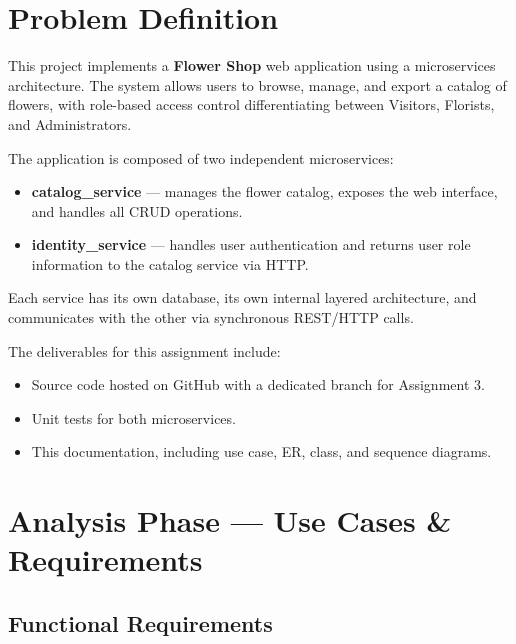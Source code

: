 \section{Problem Definition}

\par This project implements a \textbf{Flower Shop} web application using a microservices architecture.
The system allows users to browse, manage, and export a catalog of flowers, with role-based access control differentiating between Visitors, Florists, and Administrators.

\par The application is composed of two independent microservices:
\begin{itemize}
    \item \textbf{catalog\_service} — manages the flower catalog, exposes the web interface, and handles all CRUD operations.
    \item \textbf{identity\_service} — handles user authentication and returns user role information to the catalog service via HTTP.
\end{itemize}

\par Each service has its own database, its own internal layered architecture, and communicates with the other via synchronous REST/HTTP calls.

\par The deliverables for this assignment include:
\begin{itemize}
    \item Source code hosted on GitHub with a dedicated branch for Assignment 3.
    \item Unit tests for both microservices.
    \item This documentation, including use case, ER, class, and sequence diagrams.
\end{itemize}


\section{Analysis Phase — Use Cases \& Requirements}

\subsection{Functional Requirements}


